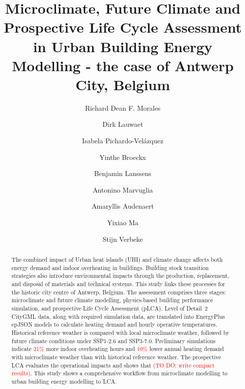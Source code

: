 \documentclass[runningheads]{llncs}
\newcommand{\TODO}[1]{\textcolor{red}{#1}}
\begin{document}
\title{Microclimate, Future Climate and Prospective Life Cycle Assessment in Urban Building Energy Modelling - the case of Antwerp City, Belgium}

\author{Richard Dean F. Morales \and
Dirk Lauwaet \and
Isabela Pichardo-Velázquez \and
Yinthe Broeckx \and
Benjamin Lanssens \and
Antonino Marvuglia \and
Amaryllis Audenaert \and
Yixiao Ma \and
Stijn Verbeke}


\maketitle

\begin{abstract}
The combined impact of Urban heat islands (UHI) and climate change affects both energy demand and indoor overheating in buildings. Building stock transition strategies also introduce environmental impacts through the production, replacement, and disposal of materials and technical systems. This study links these processes for the historic city centre of Antwerp, Belgium. The assessment comprises three stages: microclimate and future climate modelling, physics-based building performance simulation, and prospective Life Cycle Assessment (pLCA). Level of Detail~2 CityGML data, along with required simulation data, are translated into EnergyPlus epJSON models to calculate heating demand and hourly operative temperatures. Historical reference weather is compared with local microclimate weather, followed by future climate conditions under SSP1-2.6 and SSP3-7.0. Preliminary simulations indicate \TODO{21\%} more indoor overheating hours and \TODO{10\%} lower annual heating demand with microclimate weather than with historical reference weather. The prospective LCA evaluates the operational impacts and shows that \TODO{(TO DO: write compact results)}. This study shows a comprehensive workflow from microclimate modelling to urban building energy modelling to LCA.

\end{abstract}
\end{document}
